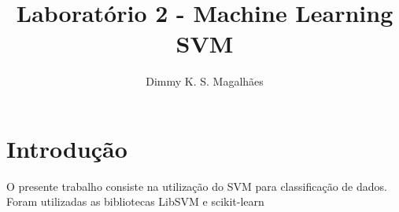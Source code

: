 \documentclass[12pt]{article}
\title{Laboratório 2 - Machine Learning\\ SVM}
\author{Dimmy K. S. Magalhães\inst{1}}
\begin{document}
 
	
	\maketitle
	
\section{Introdução}

O presente trabalho consiste na utilização do SVM para classificação de dados. Foram utilizadas as bibliotecas LibSVM e scikit-learn
\end{document}
